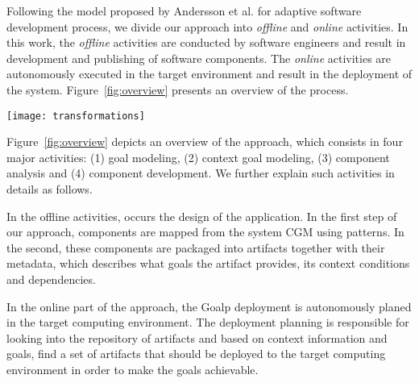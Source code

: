 \label{sec:proposal}



Following the model proposed by Andersson et al.\cite{andersson_software_2013} for adaptive software development process, we divide our approach into \emph{offline} and \emph{online} activities. In this work, the \emph{offline} activities are conducted by software engineers and result in development and publishing of software components. The \emph{online} activities are autonomously executed in the target environment and result in the deployment of the system. Figure~\ref{fig:overview} presents an overview of the process.

\begin{figure*}[!htb]
  \centering
  \texttt{[image: transformations]}
  \caption{Overview}
\label{fig:overview}
\end{figure*}

Figure~\ref{fig:overview} depicts an overview of the approach, which consists in four major activities: (1) goal modeling, (2) context goal modeling, (3) component analysis and (4) component development. We further explain such activities in details as follows.

In the offline activities, occurs the design of the application. In the first step of our approach, components are mapped from the system CGM using patterns. In the second, these components are packaged into artifacts together with their metadata, which describes what goals the artifact provides, its context conditions and dependencies.

In the online part of the approach, the Goalp deployment is autonomously planed in the target computing environment.
The deployment planning is responsible for looking into the repository of artifacts and based on context information and goals, find a set of artifacts that should be deployed to the target computing environment in order to make the goals achievable.


